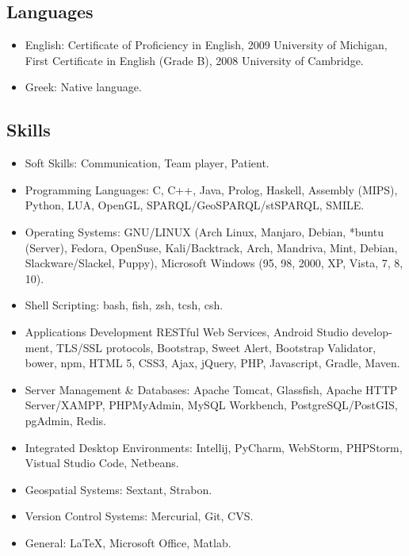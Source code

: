 \documentclass[a4paper,oneside,11pt]{article}
\begin{document}
\subsection*{Languages}

\begin{itemize}

\item English: \textlatin{Certificate of Proficiency in English, 2009 University of Michigan, First Certificate in English (Grade B), 2008 University of Cambridge.}

\item Greek: Native language.

\end{itemize}

\subsection*{Skills}

\begin{itemize}

\item Soft Skills: Communication, Team player, Patient.

\item Programming Languages: \textlatin{C, C++, Java, Prolog, Haskell, Assembly (MIPS), Python, LUA, OpenGL, SPARQL/GeoSPARQL/stSPARQL, SMILE}.

\item Operating Systems: \textlatin{GNU/LINUX (Arch Linux, Manjaro, Debian, *buntu (Server), Fedora, OpenSuse, Kali/Backtrack, Arch, Mandriva, Mint, Debian, Slackware/Slackel, Puppy), Microsoft Windows (95, 98, 2000, XP, Vista, 7, 8, 10)}.

\item Shell Scripting: \textlatin{bash, fish, zsh, tcsh, csh}.

\item Applications Development \textlatin{RESTful Web Services, Android Studio development, TLS/SSL protocols, Bootstrap, Sweet Alert, Bootstrap Validator, bower, npm, HTML 5, CSS3, Ajax, jQuery, PHP, Javascript, Gradle, Maven}.

\item Server Management \& Databases: \textlatin{Apache Tomcat, Glassfish, Apache HTTP Server/XAMPP, PHPMyAdmin, MySQL Workbench, PostgreSQL/PostGIS, pgAdmin, Redis}.

\item Integrated Desktop Environments: \textlatin{Intellij, PyCharm, WebStorm, PHPStorm, Vistual Studio Code, Netbeans}.

\item Geospatial Systems: \textlatin{Sextant, Strabon}.

\item Version Control Systems: \textlatin{Mercurial, Git, CVS}.

\item General: \textlatin{\LaTeX, Microsoft Office, Matlab}.

\end{itemize}
\end{document}

